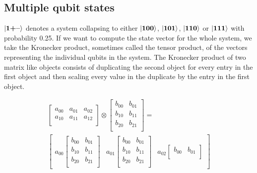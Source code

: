 \subsection{Multiple qubit states}
$\ket{\mathbf{1}\textbf{+}\textbf{--}}$ denotes a system collapsing to either $\ket{\mathbf{1}\mathbf{0}\mathbf{0}}$, $\ket{\mathbf{1}\mathbf{0}\mathbf{1}}$, $\ket{\mathbf{1}\mathbf{1}\mathbf{0}}$ or $\ket{\mathbf{1}\mathbf{1}\mathbf{1}}$ with probability 0.25. 
If we want to compute the state vector for the whole system, we take the Kronecker product\cite{kronecker_product}, sometimes called the tensor product, of the vectors representing the individual qubits in the system. 
The Kronecker product of two matrix like objects consists of duplicating the second object for every entry in the first object and then scaling every value in the duplicate by the entry in the first object.
\begin{figure}[H]
    \centering
    \begin{gather*}
        \begin{bmatrix}
            a_{00} & a_{01} & a_{02} \\
            a_{10} & a_{11} & a_{12} \\
        \end{bmatrix}
        \otimes
        \begin{bmatrix}
            b_{00} & b_{01} \\
            b_{10} & b_{11} \\
            b_{20} & b_{21} \\
        \end{bmatrix}
        = \\
        \begin{bmatrix}
            a_{00}
            \begin{bmatrix}
                b_{00} & b_{01} \\
                b_{10} & b_{11} \\
                b_{20} & b_{21} \\
            \end{bmatrix} 
            & a_{01}
            \begin{bmatrix}
                b_{00} & b_{01} \\
                b_{10} & b_{11} \\
                b_{20} & b_{21} \\
            \end{bmatrix} 
            & a_{02}
            \begin{bmatrix}
                b_{00} & b_{01} \\

\end{bmatrix}
\end{bmatrix}
\end{gather*}
\end{figure}
